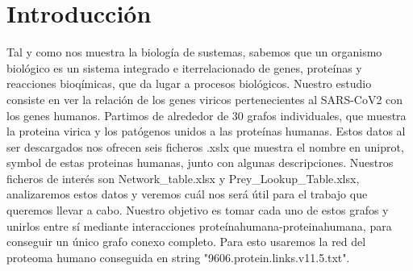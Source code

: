 \section{Introducción}

Tal y como nos muestra la biología de sustemas, sabemos que un organismo biológico es un sistema integrado e iterrelacionado de genes, proteínas y reacciones bioqímicas, que da lugar a procesos biológicos. Nuestro estudio consiste en ver la relación de los genes viricos pertenecientes al SARS-CoV2 con los genes humanos. Partimos de alrededor de 30 grafos individuales, que muestra la proteina virica y los patógenos unidos a las proteínas humanas. Estos datos al ser descargados nos ofrecen seis ficheros .xslx que muestra el nombre en uniprot, symbol de estas proteinas humanas, junto con algunas descripciones. Nuestros ficheros de interés son Network_table.xlsx y Prey_Lookup_Table.xlsx, analizaremos estos datos y veremos cuál nos será útil para el trabajo que queremos llevar a cabo. Nuestro objetivo es tomar cada uno de estos grafos y unirlos entre sí mediante interacciones proteínahumana-proteinahumana, para conseguir un único grafo conexo completo. Para esto usaremos la red del proteoma humano conseguida en string "9606.protein.links.v11.5.txt".

